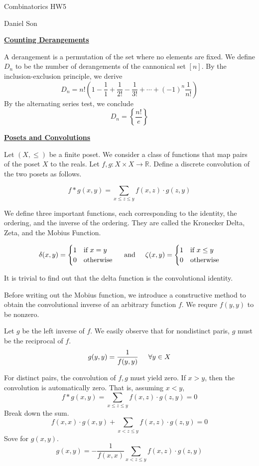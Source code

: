 \documentclass{article}
\newcommand{\new}[1]{
    \vspace{2mm}
    \noindent
    \textbf{
    \underline{#1}}
}
\newcommand{\textAnd}{
    {
        \hspace{5mm}
        \textrm{and}
        \hspace{5mm}
    }
}
\newcommand{\m}{
    \cdot
}
\begin{document}
\begin{center}
\LARGE
Combinatorics HW5

\Large
Daniel Son
\end{center}

\new{Counting Derangements}
A derangement is a permutation of the set 
where no elements are fixed. 
We define $D_n$ to be the number of 
derangements of the cannonical set $[n]$.
By the inclusion-exclusion 
principle, we derive 
\[
    D_n = n!\left(1 - \frac{1}1 + \frac1{2!} - \frac1{3!} + \cdots +(-1)^n\frac1{n!}\right)
\]
By the alternating series test, we conclude 
\[
    D_n = \left\{
        \frac{n!}e
    \right\}
\]

\new{Posets and Convolutions}

Let $(X, \leq)$ be a finite poset. We consider 
a class of functions that map pairs of the poset 
$X$ to the reals. Let $f, g: X \times X \rightarrow \mathbb{R}$. 
Define a discrete convolution of the two posets as follows. 

\[
    f * g(x, y) = \sum_{x \leq z \leq y} f(x, z) \m g(z, y)
\]

We define three important functions, each corresponding 
to the identity, the ordering, and the inverse of the ordering. 
They are called the Kronecker Delta, Zeta, and the Mobius Function. 

\[
\delta(x, y) =
\begin{cases}
     1 &\text{if } x = y \\ 
    0 &\text{otherwise} \\
\end{cases}
\textAnd
\zeta(x, y) =
\begin{cases}
     1 &\text{if } x \leq y \\ 
    0 &\text{otherwise} \\
\end{cases}
\]

It is trivial to find out that the delta function is 
the convolutional identity. 

Before writing out the Mobius function, we introduce a 
constructive method to obtain the convolutional inverse 
of an arbitrary function $f$. We requre $f(y, y)$ to be 
nonzero. 

Let $g$ be the left inverse of $f$. We easily observe 
that for nondistinct paris, $g$ must be the reciprocal of 
$f$. 
\[
    g(y, y) = \frac 1{f(y, y)} \hspace{5mm} \forall y \in X
\]

For distinct pairs, the convolution of $f, g$ must yield zero. 
If $x > y$, then the convolution is automatically zero. 
That is, 
assuming $x < y$, 
\[
    f*g(x, y) = 
    \sum_{x \leq z \leq y} f(x, z) \m g(z, y) = 0
\]
Break down the sum. 
\[
    f(x, x) \m g(x, y) + \sum_{x < z \leq y} f(x, z) \m g(z, y)
     = 0
\]
Sove for $g(x, y)$. 
\[
    g(x, y) = -
    \frac{1}{f(x, x)} \sum_{x < z \leq y} f(x, z) \m g(z, y)
\]
\end{document}
